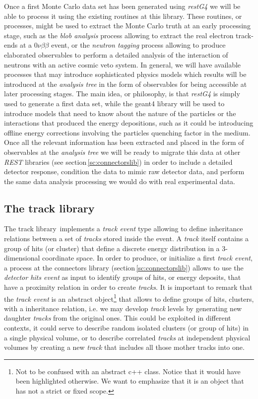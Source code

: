 Once a first Monte Carlo data set has been generated using \emph{restG4} we will be able to process it using the existing routines at this library. These routines, or processes, might be used to extract the Monte Carlo truth at an early processing stage, such as the \emph{blob analysis} process allowing to extract the real electron track-ends at a $0\nu\beta\beta$ event, or the \emph{neutron tagging} process allowing to produce elaborated observables to perform a detailed analysis of the interaction of neutrons with an active cosmic veto system. In general, we will have available processes that may introduce sophisticated physics models which results will be introduced at the \emph{analysis tree} in the form of observables for being accessible at later processing stages. The main idea, or philosophy, is that \emph{restG4} is simply used to generate a first data set, while the geant4 library will be used to introduce models that need to know about the nature of the particles or the interactions that produced the energy depositions, such as it could be introducing offline energy corrections involving the particles quenching factor in the medium. Once all the relevant information has been extracted and placed in the form of observables at the \emph{analysis tree} we will be ready to migrate this data at other \emph{REST} libraries (see section\,\ref{sc:connectorslib}) in order to include a detailed detector response, condition the data to mimic raw detector data, and perform the same data analysis processing we would do with real experimental data.

\subsection{The track library}\label{sc:tracklib}

The track library\,\cite{REST_Track_Git} implements a \emph{track event} type allowing to define inheritance relations between a set of \emph{tracks} stored inside the event. A \emph{track} itself contains a group of hits (or cluster) that define a discrete energy distribution in a 3-dimensional coordinate space. In order to produce, or initialize a first \emph{track event}, a process at the connectors library (section\,\ref{sc:connectorslib}) allows to use the \emph{detector hits event} as input to identify groups of hits, or energy deposits, that have a proximity relation in order to create \emph{tracks}. It is important to remark that the \emph{track event} is an abstract object\footnote{Not to be confused with an abstract c++ class. Notice that it would have been highlighted otherwise. We want to emphasize that it is an object that has not a strict or fixed scope.} that allows to define groups of hits, clusters, with a inheritance relation, i.e. we may develop \emph{track} levels by generating new daughter \emph{tracks} from the original ones. This could be exploited in different contexts, it could serve to describe random isolated clusters (or group of hits) in a single physical volume, or to describe correlated \emph{tracks} at independent physical volumes by creating a new \emph{track} that includes all those mother tracks into one.


